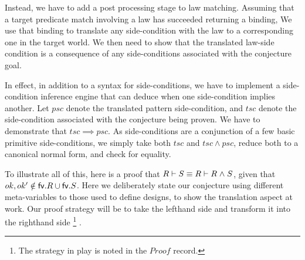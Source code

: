 Instead, we have to add a post processing stage to law matching.
Assuming that a target predicate match involving a law has succeeded
returning a binding,
We use that binding to translate any side-condition with the law
to a corresponding one in the target world.
We then need to show that the translated law-side condition
is a consequence of any side-conditions associated with the conjecture goal.

In effect, in addition to a syntax for side-conditions,
we have to implement a side-condition inference engine
that can deduce when one side-condition implies another.
Let $psc$ denote the translated pattern side-condition,
and $tsc$ denote the side-condition associated with the conjecture being proven.
We have to demonstrate that $tsc \implies psc$.
As side-conditions are a conjunction of a few basic primitive side-conditions,
we simply take both $tsc$ and $tsc \land psc$,
reduce both to a canonical normal form, and check for equality.


To illustrate all of this, here is a proof that $R \vdash S \equiv R \vdash R \mathrel{\wedge} S$,
given that $ok, ok' \notin \mathsf{fv}.R \cup \mathsf{fv}.S$.
Here we deliberately state our conjecture using different meta-variables
to those used to define designs, to show the translation aspect at work.
Our proof strategy will be to take the lefthand side
and transform it into the righthand side%
\footnote{
The strategy in play is noted in the $Proof$ record.
}%
.

